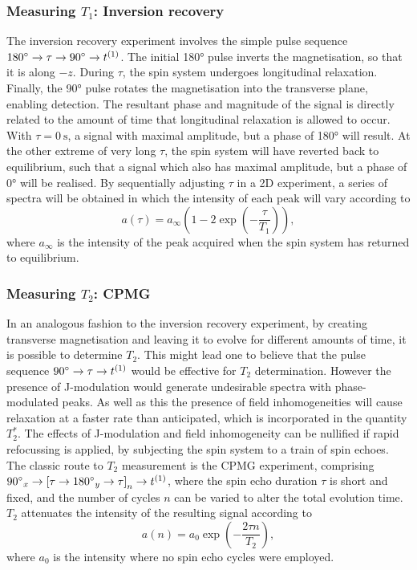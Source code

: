 \subsubsection{Measuring $T_1$: Inversion recovery}
\label{subsec:invrec}
The inversion recovery experiment involves the simple pulse sequence $\ang{180}
\rightarrow \tau \rightarrow \ang{90} \rightarrow t^{(1)}$. The initial
\ang{180} pulse inverts the magnetisation, so that it is along $-z$. During
$\tau$, the spin system undergoes longitudinal
relaxation. Finally, the \ang{90} pulse rotates the magnetisation into the
transverse plane, enabling detection. The resultant phase and magnitude of the
signal is directly related to the amount of time that longitudinal relaxation
is allowed to occur. With $\tau = \qty{0}{\second}$, a signal with
maximal amplitude, but a phase of \ang{180} will result. At the other extreme of
very long $\tau$, the spin system will have reverted
back to equilibrium, such that a signal which also has maximal amplitude, but a
phase of \ang{0} will be realised. By sequentially adjusting $\tau$ in a
\ac{2D} experiment, a series of spectra will be obtained in which the intensity
of each peak will vary according to
\begin{equation}
    a\left(\tau\right) = a_{\infty} \left( 1 - 2 \exp\left( -\frac{\tau}{T_1}\right) \right),
\end{equation}
where $a_{\infty}$ is the intensity of the peak acquired when the spin system
has returned to equilibrium.


\subsubsection{Measuring $T_2$: \acs{CPMG}}
\label{subsec:cpmg}
In an analogous fashion to the inversion recovery experiment, by creating
transverse magnetisation and leaving it to evolve for different amounts of
time, it is possible to determine $T_2$. This might lead one to believe
that the pulse sequence $\ang{90} \rightarrow \tau \rightarrow t^{(1)}$ would be
effective for  $T_2$ determination. However the presence of J-modulation would
generate undesirable spectra with phase-modulated peaks. As well as this the presence of field inhomogeneities will cause relaxation at a faster rate than anticipated, which is incorporated in the quantity $T_2^*$. The effects of
J-modulation and field inhomogeneity can be nullified if rapid refocussing is
applied, by subjecting the spin system to a train of spin echoes. The classic
route to $T_2$ measurement is the \ac{CPMG}
experiment\cite{Carr1954,Meiboom1958}, comprising $\ang{90}_x \rightarrow
\left[ \tau \rightarrow \ang{180}_y \rightarrow \tau \right]_n \rightarrow
t^{(1)}$, where the spin echo duration $\tau$ is short and fixed, and the number
of cycles $n$ can be varied to alter the total evolution time. $T_2$ attenuates
the intensity of the resulting signal according to
\begin{equation}
    a(n) = a_0 \exp\left(-\frac{2 \tau n}{T_2}\right),
\end{equation}
where $a_0$ is the intensity where no spin echo cycles were employed.

